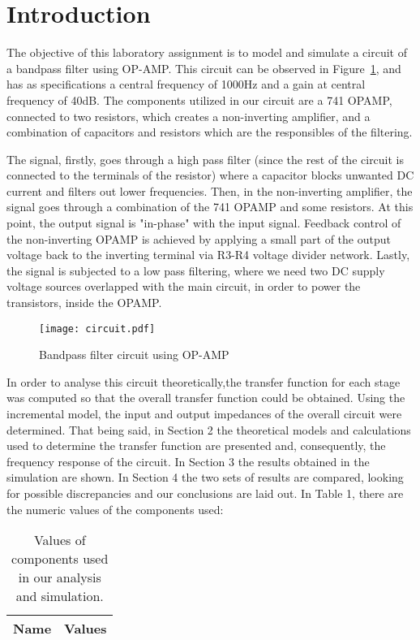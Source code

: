 \section{Introduction}
\label{sec:introduction}
The objective of this laboratory assignment is to model and simulate a circuit of a bandpass filter using OP-AMP. This circuit can be observed in Figure~\ref{fig:cir}, and has as specifications a central frequency of 1000Hz and a gain at central frequency of 40dB.
 The components utilized in our circuit are a 741 OPAMP, connected to two resistors, which creates a non-inverting amplifier, and a combination of capacitors and resistors which are the responsibles of the filtering.

 The signal, firstly, goes through a high pass filter (since the rest of the circuit is connected to the terminals of the resistor) where a capacitor blocks unwanted DC current and filters out lower frequencies. Then, in the non-inverting amplifier, the signal goes through a combination of the 741 OPAMP and some resistors. At this point, the output signal is "in-phase" with the input signal. Feedback control of the non-inverting OPAMP is achieved by applying a small part of the output voltage back to the inverting terminal via R3-R4 voltage divider network. Lastly, the signal is subjected to a low pass filtering, where we need two DC supply voltage sources overlapped with the main circuit, in order to power the transistors, inside the OPAMP.

\begin{figure}[h] \centering
\texttt{[image: circuit.pdf]}
\caption{Bandpass filter circuit using OP-AMP}
	\label{fig:cir}
\end{figure}

In order to analyse this circuit theoretically,the transfer function for each stage was computed so that the overall transfer function could be obtained. Using the incremental model, the input and output impedances of the overall circuit were determined.
That being said, in Section 2 the theoretical models and calculations used to determine the transfer function are presented and, consequently, the frequency response of the circuit. In Section 3 the results obtained in the simulation are shown. In Section 4 the two sets of results are compared, looking for possible discrepancies and our conclusions are laid out.
In Table 1, there are the numeric values of the components used:

\begin{table}[h]
  \centering
  \begin{tabular}{|l|r|}
    \hline    
    {\bf Name} & {\bf Values} \\ \hline
     
  \end{tabular}
  \caption{Values of components used in our analysis and simulation.}
  \label{tab:data}
\end{table}

